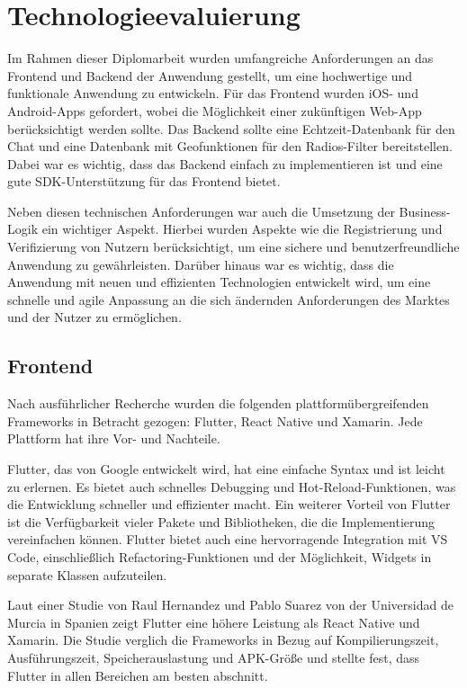 \section{Technologieevaluierung}

Im Rahmen dieser Diplomarbeit wurden umfangreiche Anforderungen an das Frontend und Backend der Anwendung gestellt, um eine hochwertige und funktionale Anwendung zu entwickeln. Für das Frontend wurden iOS- und Android-Apps gefordert, wobei die Möglichkeit einer zukünftigen Web-App berücksichtigt werden sollte. Das Backend sollte eine Echtzeit-Datenbank für den Chat und eine Datenbank mit Geofunktionen für den Radios-Filter bereitstellen. Dabei war es wichtig, dass das Backend einfach zu implementieren ist und eine gute SDK-Unterstützung für das Frontend bietet.

Neben diesen technischen Anforderungen war auch die Umsetzung der Business-Logik ein wichtiger Aspekt. Hierbei wurden Aspekte wie die Registrierung und Verifizierung von Nutzern berücksichtigt, um eine sichere und benutzerfreundliche Anwendung zu gewährleisten. Darüber hinaus war es wichtig, dass die Anwendung mit neuen und effizienten Technologien entwickelt wird, um eine schnelle und agile Anpassung an die sich ändernden Anforderungen des Marktes und der Nutzer zu ermöglichen.


\subsection{Frontend}

Nach ausführlicher Recherche wurden die folgenden plattformübergreifenden Frameworks in Betracht gezogen: Flutter, React Native und Xamarin. Jede Plattform hat ihre Vor- und Nachteile.

Flutter, das von Google entwickelt wird, hat eine einfache Syntax und ist leicht zu erlernen. Es bietet auch schnelles Debugging und Hot-Reload-Funktionen, was die Entwicklung schneller und effizienter macht. Ein weiterer Vorteil von Flutter ist die Verfügbarkeit vieler Pakete und Bibliotheken, die die Implementierung vereinfachen können. Flutter bietet auch eine hervorragende Integration mit VS Code, einschließlich Refactoring-Funktionen und der Möglichkeit, Widgets in separate Klassen aufzuteilen.

Laut einer Studie von Raul Hernandez und Pablo Suarez von der Universidad de Murcia in Spanien zeigt Flutter eine höhere Leistung als React Native und Xamarin. Die Studie verglich die Frameworks in Bezug auf Kompilierungszeit, Ausführungszeit, Speicherauslastung und APK-Größe und stellte fest, dass Flutter in allen Bereichen am besten abschnitt. \cite{hernandez_suarez_2021}

